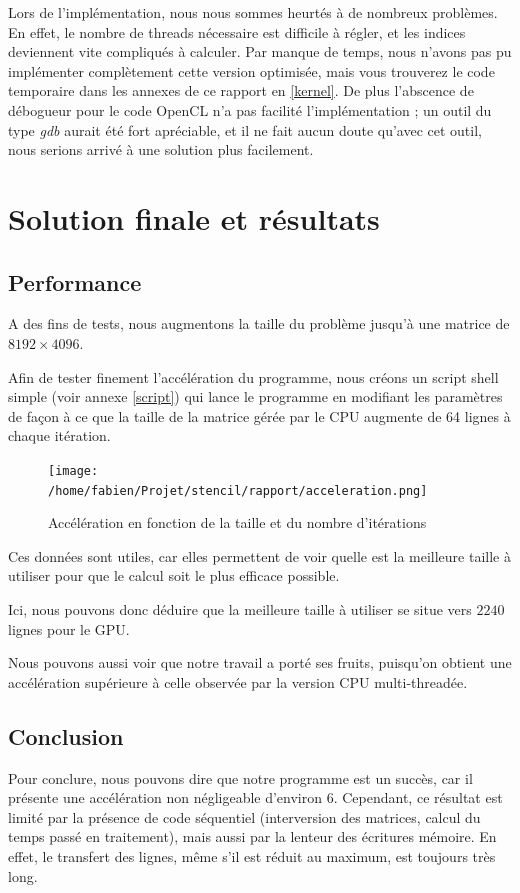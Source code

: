 \documentclass{article}
\begin{document}
Lors de l'implémentation, nous nous sommes heurtés à de nombreux problèmes. En effet, le nombre de threads nécessaire est difficile à régler, et les indices deviennent vite compliqués à calculer.
Par manque de temps, nous n'avons pas pu implémenter complètement cette version optimisée, mais vous trouverez le code temporaire dans les annexes de ce rapport en \ref{kernel}.
De plus l'abscence de débogueur pour le code OpenCL n'a pas facilité l'implémentation ; un outil du type \textit{gdb} aurait été fort apréciable, et il ne fait aucun doute qu'avec cet outil, nous serions arrivé à une solution plus facilement.

\section{Solution finale et résultats}
\subsection{Performance}
A des fins de tests, nous augmentons la taille du problème jusqu'à une matrice de $8192\times4096$.

Afin de tester finement l'accélération du programme, nous créons un script shell simple (voir annexe \ref{script}) qui lance le programme en modifiant les paramètres de façon à ce que la taille de la matrice gérée par le CPU augmente de 64 lignes à chaque itération.

\begin{figure}[htp]
\texttt{[image: /home/fabien/Projet/stencil/rapport/acceleration.png]}
\caption{Accélération en fonction de la taille et du nombre d'itérations}
\label{acceleration}
\end{figure}

Ces données sont utiles, car elles permettent de voir quelle est la meilleure taille à utiliser pour que le calcul soit le plus efficace possible.

Ici, nous pouvons donc déduire que la meilleure taille à utiliser se situe vers $2240$ lignes pour le GPU.

Nous pouvons aussi voir que notre travail a porté ses fruits, puisqu'on obtient une accélération supérieure à celle observée par la version CPU multi-threadée.

\subsection{Conclusion}
Pour conclure, nous pouvons dire que notre programme est un succès, car il présente une accélération non négligeable d'environ 6. 
Cependant, ce résultat est limité par la présence de code séquentiel (interversion des matrices, calcul du temps passé en traitement), mais aussi par la lenteur des écritures mémoire. En effet, le transfert des lignes, même s'il est réduit au maximum, est toujours très long.
\end{document}
